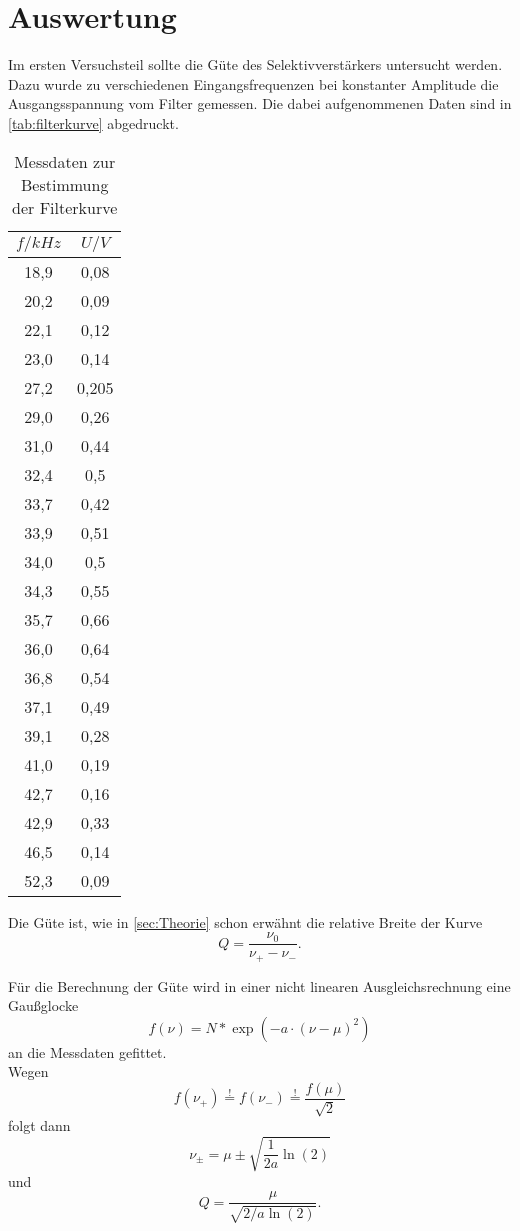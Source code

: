 \section{Auswertung}
\label{sec:Auswertung}

Im ersten Versuchsteil sollte die Güte des Selektivverstärkers untersucht werden. Dazu
wurde zu verschiedenen Eingangsfrequenzen bei konstanter Amplitude die Ausgangsspannung
vom Filter gemessen. Die dabei aufgenommenen Daten sind in \autoref{tab:filterkurve}
abgedruckt.

\begin{table}
  \centering
  \caption{Messdaten zur Bestimmung der Filterkurve}
  \label{tab:filterkurve}
  \begin{tabular}{c c}
  \toprule
  $f / \si{kHz}$	& $U / \si{V}$ \\
  \midrule
  18,9&0,08	\\
  20,2&0,09	\\
  22,1&0,12	\\
  23,0&0,14	\\
  27,2&0,205	\\
  29,0&0,26	\\
  31,0&0,44	\\
  32,4&0,5	\\
  33,7&0,42	\\
  33,9&0,51	\\
  34,0&0,5	\\
  34,3&0,55	\\
  35,7&0,66	\\
  36,0&0,64	\\
  36,8&0,54	\\
  37,1&0,49	\\
  39,1&0,28	\\
  41,0&0,19	\\
  42,7&0,16	\\
  42,9&0,33	\\
  46,5&0,14	\\
  52,3&0,09	\\
  \bottomrule
  \end{tabular}
\end{table}

Die Güte ist, wie in \autoref{sec:Theorie} schon erwähnt die relative Breite der Kurve
\[
	Q = \frac{\nu_0}{\nu_+ - \nu_-}.
\]

Für die Berechnung der Güte wird in einer nicht linearen Ausgleichsrechnung eine
Gaußglocke
\begin{equation}
	\label{eqn:gauss-glocke}
	f(\nu) = N * \exp\left(-a \cdot (\nu - \mu)^2\right)
\end{equation}
an die Messdaten gefittet.
\\
Wegen
\begin{equation}
	f(\nu_+) \overset{!}{=} 
	f(\nu_-) \overset{!}{=} 
	\frac{f(\mu)}{\sqrt{2}}
\end{equation}
folgt dann
\begin{equation}
	\label{eqn:nu-plus-minus}
	\nu_\pm = \mu \pm \sqrt{\frac{1}{2a} \ln(2)}
\end{equation}
und 
\begin{equation}
	\label{eqn:Q-Auswertung}
	Q = \frac{\mu}{\sqrt{2/a \ln(2)}}.
\end{equation}

